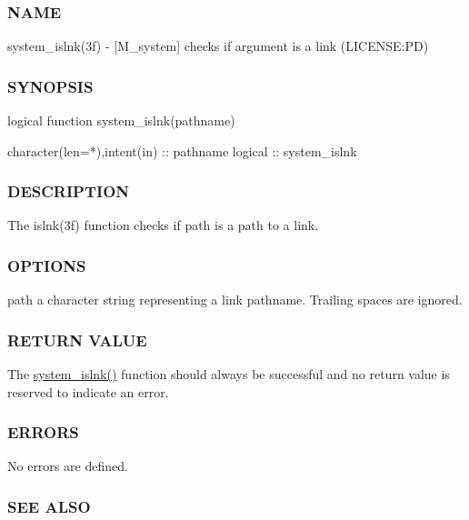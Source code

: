 \subsubsection*{N\+A\+ME}

system\+\_\+islnk(3f) -\/ \mbox{[}M\+\_\+system\mbox{]} checks if argument is a link (L\+I\+C\+E\+N\+SE\+:PD) 

\subsubsection*{S\+Y\+N\+O\+P\+S\+IS}

\begin{DoxyVerb}logical function system_islnk(pathname)

character(len=*),intent(in) :: pathname
logical                     :: system_islnk
\end{DoxyVerb}


\subsubsection*{D\+E\+S\+C\+R\+I\+P\+T\+I\+ON}

The islnk(3f) function checks if path is a path to a link.

\subsubsection*{O\+P\+T\+I\+O\+NS}

path a character string representing a link pathname. Trailing spaces are ignored.

\subsubsection*{R\+E\+T\+U\+RN V\+A\+L\+UE}

The \mbox{\hyperlink{namespacem__system_ab05694cc3d76a3ecc87e4b4490c4c217}{system\+\_\+islnk()}} function should always be successful and no return value is reserved to indicate an error.

\subsubsection*{E\+R\+R\+O\+RS}

No errors are defined.

\subsubsection*{S\+EE A\+L\+SO}

